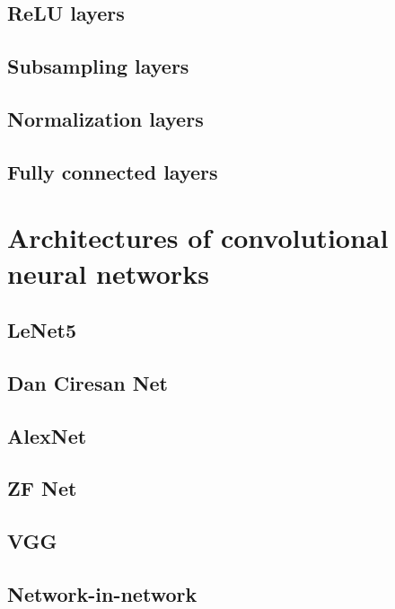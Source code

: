 \subsection{ReLU layers}
\label{relu-layers}



\subsection{Subsampling layers}
\label{subsampling}

\subsection{Normalization layers}
\label{norm-layers}

\subsection{Fully connected layers}
\label{fc-layers}

\section{Architectures of convolutional neural networks}
\label{cnn-architectures}

\subsection{LeNet5} %
\label{lenet}

\subsection{Dan Ciresan Net}
\label{ciresan}

\subsection{AlexNet} %
\label{alexnet}


\subsection{ZF Net}
\label{zfnet}

\subsection{VGG} %
\label{vgg}

\subsection{Network-in-network}
\label{nin}

